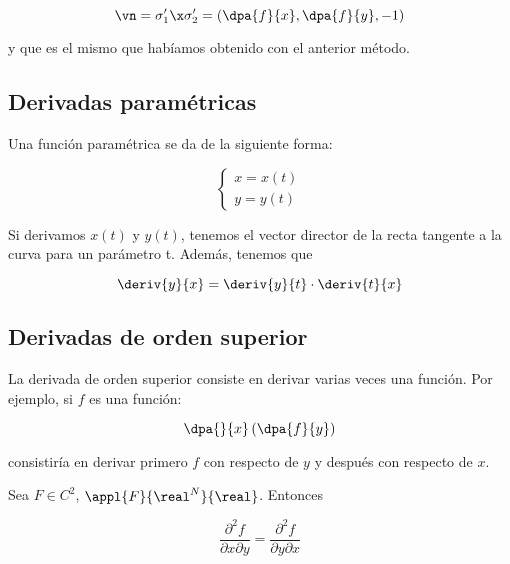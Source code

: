 \documentclass[12pt,a4paper,titlepage]{apuntes}
\begin{document}
\[ \vn = \sigma_1'\x\sigma_2' = \left(\dpa{f}{x}, \dpa{f}{y}, -1\right) \]

y que es el mismo que habíamos obtenido con el anterior método.

\subsection{Derivadas paramétricas}

Una función paramétrica se da de la siguiente forma:

\[ \left\lbrace \begin{matrix}
x = x(t) \\ y = y(t)
\end{matrix}\right. \]

Si derivamos $x(t)$ y $y(t)$, tenemos el vector director de la recta tangente a la curva para un parámetro t. Además, tenemos que

\[ \deriv{y}{x} = \deriv{y}{t} \cdot \deriv{t}{x} \]

\subsection{Derivadas de orden superior}

La derivada de orden superior consiste en derivar varias veces una función. Por ejemplo, si $f$ es una función:

\[ \dpa{}{x}\left(\dpa{f}{y}\right)  \]

consistiría en derivar primero $f$ con respecto de $y$ y después con respecto de $x$.

\begin{theorem}
Sea $F\in C^2$, $\appl{F}{\real^N}{\real}$. Entonces

\[ \frac{∂^2 f}{∂x∂y} = \frac{∂^2 f}{∂y∂x} \]
\end{theorem}
\end{document}
